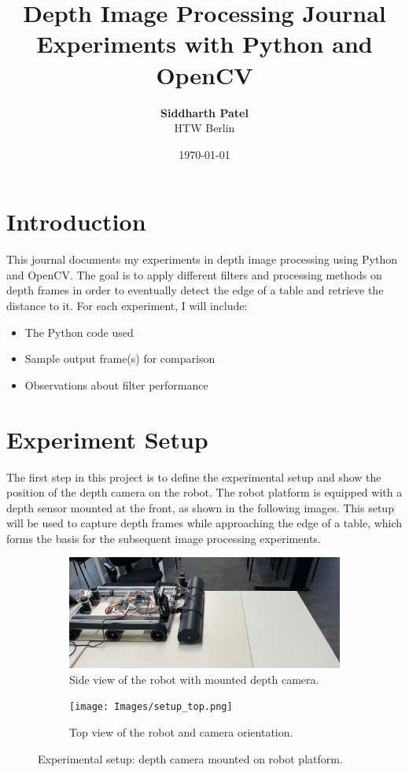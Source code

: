 \documentclass[a4paper,11pt]{article}
\title{\Huge \textbf{Depth Image Processing Journal}\\[1ex]
	\Large Experiments with Python and OpenCV}
\author{\textbf{Siddharth Patel} \\ HTW Berlin}
\date{\today}
\begin{document}
	
	\maketitle
	\thispagestyle{empty}
	\newpage
	\tableofcontents
	\newpage

	
	\section{Introduction}
	This journal documents my experiments in depth image processing using Python and OpenCV. 
	The goal is to apply different filters and processing methods on depth frames in order 
	to eventually detect the edge of a table and retrieve the distance to it. 
	For each experiment, I will include:
	\begin{itemize}[noitemsep]
		\item The Python code used
		\item Sample output frame(s) for comparison
		\item Observations about filter performance
	\end{itemize}
	
	\section{Experiment Setup}
	
	The first step in this project is to define the experimental setup and show the position of the depth camera on the robot. 
	The robot platform is equipped with a depth sensor mounted at the front, as shown in the following images. 
	This setup will be used to capture depth frames while approaching the edge of a table, which forms the basis for the 
	subsequent image processing experiments.
	
	\begin{figure}[h!]
		\centering
		\begin{subfigure}{0.48\textwidth}
			\centering
			\includegraphics[width=\linewidth]{Images/setup_side.png}
			\caption{Side view of the robot with mounted depth camera.}
		\end{subfigure}\hfill
		\begin{subfigure}{0.48\textwidth}
			\centering
			\texttt{[image: Images/setup\_top.png]}
			\caption{Top view of the robot and camera orientation.}
		\end{subfigure}
		\caption{Experimental setup: depth camera mounted on robot platform.}
	\end{figure}
	
\end{document}
